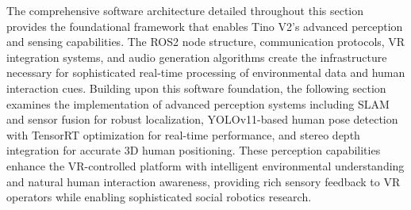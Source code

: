 The comprehensive software architecture detailed throughout this section provides the foundational framework that enables Tino V2's advanced perception and sensing capabilities. The ROS2 node structure, communication protocols, VR integration systems, and audio generation algorithms create the infrastructure necessary for sophisticated real-time processing of environmental data and human interaction cues. Building upon this software foundation, the following section examines the implementation of advanced perception systems including SLAM and sensor fusion for robust localization, YOLOv11-based human pose detection with TensorRT optimization for real-time performance, and stereo depth integration for accurate 3D human positioning. These perception capabilities enhance the VR-controlled platform with intelligent environmental understanding and natural human interaction awareness, providing rich sensory feedback to VR operators while enabling sophisticated social robotics research.

